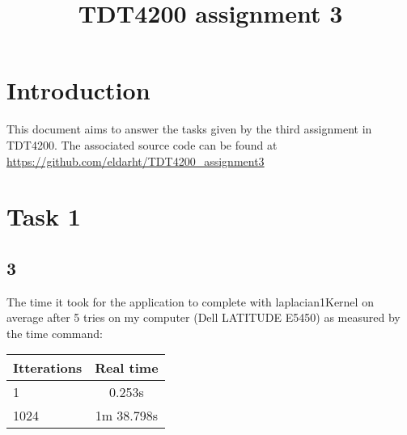 \documentclass{article}
\title{TDT4200 assignment 3}
\begin{document}
\maketitle
\section*{Introduction}
This document aims to answer the tasks given by the third assignment in TDT4200.
The associated source code can be found at \url{https://github.com/eldarht/TDT4200_assignment3}

\section*{Task 1}
\subsection*{3}
The time it took for the application to complete with laplacian1Kernel on average after 5 tries on my computer (Dell LATITUDE E5450) as measured by the time command:

\begin{tabular}{|l|c|}
	Itterations & Real time \\
	\hline
	1			& 0.253s	\\
	1024		& 1m 38.798s\\
\end{tabular}
\end{document}

